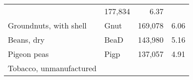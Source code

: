 \documentclass[]{article}
\begin{document}
\begin{longtable}[]{@{}llrr@{}}
\begin{minipage}[t]{0.16\columnwidth}
\end{minipage} & \begin{minipage}[t]{0.12\columnwidth}\raggedleft\strut
177,834\strut
\end{minipage} & \begin{minipage}[t]{0.09\columnwidth}\raggedleft\strut
6.37\strut
\end{minipage}\tabularnewline
\begin{minipage}[t]{0.36\columnwidth}\raggedright\strut
Groundnuts, with shell\strut
\end{minipage} & \begin{minipage}[t]{0.16\columnwidth}\raggedright\strut
Gnut\strut
\end{minipage} & \begin{minipage}[t]{0.12\columnwidth}\raggedleft\strut
169,078\strut
\end{minipage} & \begin{minipage}[t]{0.09\columnwidth}\raggedleft\strut
6.06\strut
\end{minipage}\tabularnewline
\begin{minipage}[t]{0.36\columnwidth}\raggedright\strut
Beans, dry\strut
\end{minipage} & \begin{minipage}[t]{0.16\columnwidth}\raggedright\strut
BeaD\strut
\end{minipage} & \begin{minipage}[t]{0.12\columnwidth}\raggedleft\strut
143,980\strut
\end{minipage} & \begin{minipage}[t]{0.09\columnwidth}\raggedleft\strut
5.16\strut
\end{minipage}\tabularnewline
\begin{minipage}[t]{0.36\columnwidth}\raggedright\strut
Pigeon peas\strut
\end{minipage} & \begin{minipage}[t]{0.16\columnwidth}\raggedright\strut
Pigp\strut
\end{minipage} & \begin{minipage}[t]{0.12\columnwidth}\raggedleft\strut
137,057\strut
\end{minipage} & \begin{minipage}[t]{0.09\columnwidth}\raggedleft\strut
4.91\strut
\end{minipage}\tabularnewline
\begin{minipage}[t]{0.36\columnwidth}\raggedright\strut
Tobacco, unmanufactured\strut
\end{minipage} & \begin{minipage}[t]{0.16\columnwidth}\raggedright\strut

\end{minipage}
\end{longtable}
\end{document}
